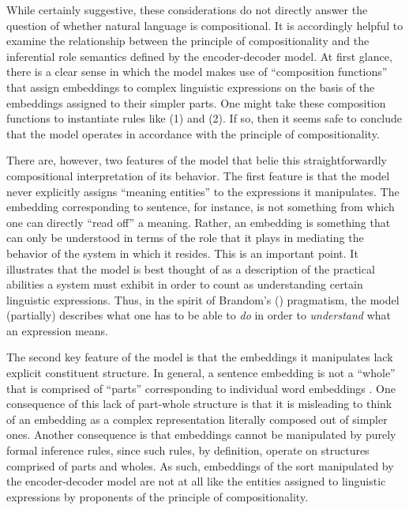 While certainly suggestive, these considerations do not directly answer the question of whether natural language is compositional. It is accordingly helpful to examine the relationship between the principle of compositionality and the inferential role semantics defined by the encoder-decoder model. At first glance, there is a clear sense in which the model makes use of ``composition functions'' that assign embeddings to complex linguistic expressions on the basis of the embeddings assigned to their simpler parts. One might take these composition functions to instantiate rules like (1) and (2). If so, then it seems safe to conclude that the model operates in accordance with the principle of compositionality. 

There are, however, two features of the model that belie this straightforwardly compositional interpretation of its behavior. The first feature is that the model never explicitly assigns ``meaning entities'' to the expressions it manipulates. The embedding corresponding to sentence, for instance, is not something from which one can directly ``read off'' a meaning. Rather, an embedding is something that can only be understood in terms of the role that it plays in mediating the behavior of the system in which it resides. This is an important point. It illustrates that the model is best thought of as a description of the practical abilities a system must exhibit in order to count as understanding certain linguistic expressions. Thus, in the spirit of Brandom's (\citeyear{Brandom:1994,Brandom:2011}) pragmatism, the model (partially) describes what one has to be able to \textit{do} in order to \textit{understand} what an expression means. 

The second key feature of the model is that the embeddings it manipulates lack explicit constituent structure. In general, a sentence embedding is not a ``whole'' that is comprised of ``parts'' corresponding to individual word embeddings \citep{Eliasmith:2013}. One consequence of this lack of part-whole structure is that it is misleading to think of an embedding as a complex representation literally composed out of simpler ones. Another consequence is that embeddings cannot be manipulated by purely formal inference rules, since such rules, by definition, operate on structures comprised of parts and wholes. As such, embeddings of the sort manipulated by the encoder-decoder model are not at all like the entities assigned to linguistic expressions by proponents of the principle of compositionality.

